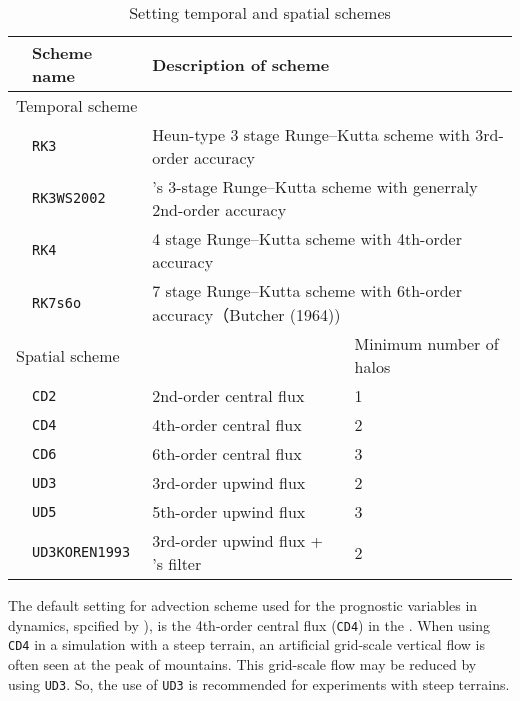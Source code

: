\begin{table}[bth]
\begin{center}
  \caption{Setting temporal and spatial schemes}
  \label{tab:nml_atm_dyn}
  \begin{tabularx}{150mm}{lllX} \hline
    \rowcolor[gray]{0.9} & \multicolumn{1}{l}{Scheme name} & \multicolumn{1}{l}{Description of scheme} & \\ \hline
    \multicolumn{3}{l}{Temporal scheme} &  \\ \hline
    & \multicolumn{1}{l}{\verb|RK3|} & \multicolumn{2}{l}{Heun-type 3 stage Runge--Kutta scheme with 3rd-order accuracy} \\
    & \multicolumn{1}{l}{\verb|RK3WS2002|} & \multicolumn{2}{l}{\citet{Wicker_2002}'s 3-stage Runge--Kutta scheme with generraly 2nd-order accuracy} \\
    & \multicolumn{1}{l}{\verb|RK4|} & \multicolumn{2}{l}{4 stage Runge--Kutta scheme with 4th-order accuracy} \\
    & \multicolumn{1}{l}{\verb|RK7s6o|} & \multicolumn{2}{l}{7 stage Runge--Kutta scheme with 6th-order accuracy（Butcher (1964))} \\
    \hline
    \multicolumn{3}{l}{Spatial scheme} & Minimum number of halos\\ \hline
    & \multicolumn{1}{l}{\verb|CD2|} & \multicolumn{1}{l}{2nd-order central flux} & \multicolumn{1}{l}{1}\\
    & \multicolumn{1}{l}{\verb|CD4|} & \multicolumn{1}{l}{4th-order central flux} & \multicolumn{1}{l}{2}\\
    & \multicolumn{1}{l}{\verb|CD6|} & \multicolumn{1}{l}{6th-order central flux} & \multicolumn{1}{l}{3}\\
    & \multicolumn{1}{l}{\verb|UD3|} & \multicolumn{1}{l}{3rd-order upwind flux} & \multicolumn{1}{l}{2}\\
    & \multicolumn{1}{l}{\verb|UD5|} & \multicolumn{1}{l}{5th-order upwind flux} & \multicolumn{1}{l}{3}\\
    & \multicolumn{1}{l}{\verb|UD3KOREN1993|} & \multicolumn{1}{l}{3rd-order upwind flux + \citet{Koren_1993}'s filter} & \multicolumn{1}{l}{2}\\
\hline
  \end{tabularx}
\end{center}
\end{table}

The default setting for advection scheme used for the prognostic variables in dynamics, spcified by ),
is the 4th-order central flux (\verb|CD4|) in the \scalerm.
When using \verb|CD4| in a simulation with a steep terrain,
an artificial grid-scale vertical flow is often seen at the peak of mountains.
This grid-scale flow may be reduced by using \verb|UD3|.
So, the use of \verb|UD3| is recommended for experiments with steep terrains.


